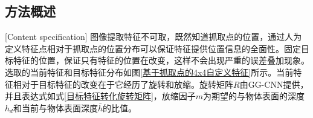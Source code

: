 \documentclass[fontset=fandol,type=bachelor,campus=harbin]{hithesisbook}
\begin{document}
\subsection{方法概述}[Content specification]
图像提取特征不可取，既然知道抓取点的位置，通过人为定义特征点相对于抓取点的位置分布可以保证特征提供位置信息的全面性。固定目标特征的位置，保证只有特征的位置在改变，这样不会出现严重的误差叠加现象。选取的当前特征和目标特征分布如图\ref{基于抓取点的4x4自定义特征}所示。当前特征相对于目标特征的改变在于它经历了旋转和放缩。旋转矩阵$R$由GG-CNN提供，并且表达式如式\ref{目标特征转化旋转矩阵}，放缩因子$m$为期望的与物体表面的深度$h_d$和当前与物体表面深度$\bar{h}$的比值。
\begin{figure}[h]
	\centering
\end{figure}
\end{document}
